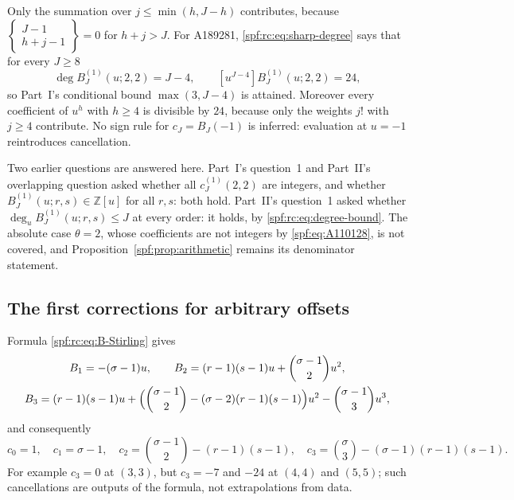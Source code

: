 \documentclass[11pt]{article}
\numberwithin{equation}{section}
\theoremstyle{definition}
\theoremstyle{remark}
\theoremstyle{definition}
\newcommand{\Z}{\mathbb Z}
\newcommand{\Stir}[2]{\left\{\begin{matrix}#1\\#2\end{matrix}\right\}}
\begin{document}
Only the summation over $j\le\min(h,J-h)$ contributes, because
$\Stir{J-1}{h+j-1}=0$ for $h+j>J$. For A189281, \eqref{spf:rc:eq:sharp-degree}
says that for every $J\ge8$
\begin{equation}
 \deg B_J^{(1)}(u;2,2)=J-4,\qquad[u^{J-4}]B_J^{(1)}(u;2,2)=24,
 \label{spf:rc:eq:A-degree}
\end{equation}
so Part~I's conditional bound $\max(3,J-4)$ is attained. Moreover every
coefficient of $u^h$ with $h\ge4$ is divisible by $24$, because only the
weights $j!$ with $j\ge4$ contribute. No sign rule for $c_J=B_J(-1)$ is
inferred: evaluation at $u=-1$ reintroduces cancellation.

Two earlier questions are answered here. Part~I's question~1 and Part~II's
overlapping question asked whether all $c_J^{(1)}(2,2)$ are integers, and
whether $B_J^{(1)}(u;r,s)\in\Z[u]$ for all $r,s$: both hold. Part~II's
question~1 asked whether $\deg_uB_J^{(1)}(u;r,s)\le J$ at every order: it
holds, by \eqref{spf:rc:eq:degree-bound}. The absolute case $\theta=2$, whose
coefficients are not integers by \eqref{spf:eq:A110128}, is not covered, and
Proposition~\ref{spf:prop:arithmetic} remains its denominator statement.

\subsection{The first corrections for arbitrary offsets}

Formula \eqref{spf:rc:eq:B-Stirling} gives
\begin{equation}
 \begin{gathered}
 B_1=-(\sigma-1)u,\qquad
 B_2=(r-1)(s-1)u+\binom{\sigma-1}2u^2,\\
 B_3=(r-1)(s-1)u
   +\Bigl(\binom{\sigma-1}2-(\sigma-2)(r-1)(s-1)\Bigr)u^2
   -\binom{\sigma-1}3u^3,
 \end{gathered}
 \label{spf:rc:eq:first-B}
\end{equation}
and consequently
\begin{equation}
 c_0=1,\quad c_1=\sigma-1,\quad
 c_2=\binom{\sigma-1}2-(r-1)(s-1),\quad
 c_3=\binom\sigma3-(\sigma-1)(r-1)(s-1).
 \label{spf:rc:eq:first-c}
\end{equation}
For example $c_3=0$ at $(3,3)$, but $c_3=-7$ and $-24$ at $(4,4)$ and
$(5,5)$; such cancellations are outputs of the formula, not extrapolations
from data.
\end{document}
